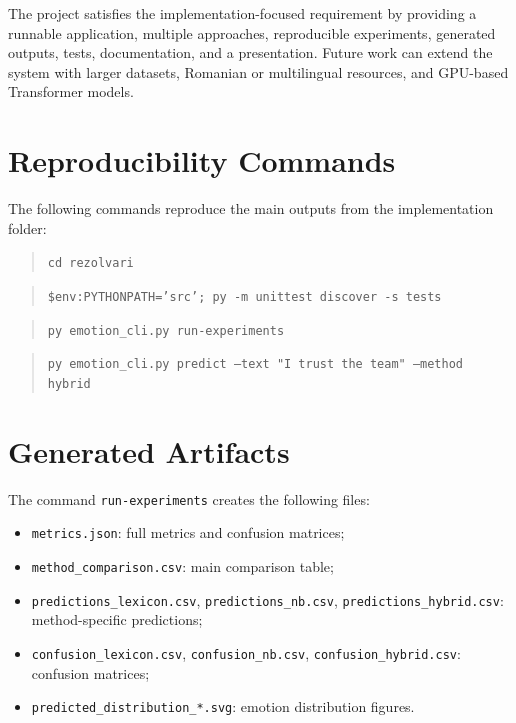 \documentclass[11pt]{article}
\begin{document}
The project satisfies the implementation-focused requirement by providing a runnable application, multiple approaches, reproducible experiments, generated outputs, tests, documentation, and a presentation. Future work can extend the system with larger datasets, Romanian or multilingual resources, and GPU-based Transformer models.

\appendix

\section{Reproducibility Commands}

The following commands reproduce the main outputs from the implementation folder:

\begin{quote}
\texttt{cd rezolvari}
\end{quote}

\begin{quote}
\texttt{\$env:PYTHONPATH='src'; py -m unittest discover -s tests}
\end{quote}

\begin{quote}
\texttt{py emotion\_cli.py run-experiments}
\end{quote}

\begin{quote}
\texttt{py emotion\_cli.py predict --text "I trust the team" --method hybrid}
\end{quote}

\section{Generated Artifacts}

The command \texttt{run-experiments} creates the following files:

\begin{itemize}
    \item \texttt{metrics.json}: full metrics and confusion matrices;
    \item \texttt{method\_comparison.csv}: main comparison table;
    \item \texttt{predictions\_lexicon.csv}, \texttt{predictions\_nb.csv}, \texttt{predictions\_hybrid.csv}: method-specific predictions;
    \item \texttt{confusion\_lexicon.csv}, \texttt{confusion\_nb.csv}, \texttt{confusion\_hybrid.csv}: confusion matrices;
    \item \texttt{predicted\_distribution\_*.svg}: emotion distribution figures.
\end{itemize}
\end{document}
